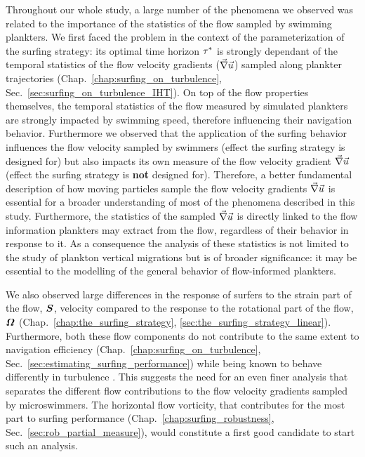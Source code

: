 Throughout our whole study, a large number of the phenomena we observed was related to the importance of the statistics of the flow sampled by swimming plankters.
We first faced the problem in the context of the parameterization of the surfing strategy: its optimal time horizon $\tau^*$ is strongly dependant of the temporal statistics of the flow velocity gradients ($\vec{\nabla} \vec{u}$) sampled along plankter trajectories (Chap.~\ref{chap:surfing_on_turbulence}, Sec.~\ref{sec:surfing_on_turbulence_IHT}).
On top of the flow properties themselves, the temporal statistics of the flow measured by simulated plankters are strongly impacted by swimming speed, therefore influencing their navigation behavior.
Furthermore we observed that the application of the surfing behavior influences the flow velocity sampled by swimmers (effect the surfing strategy is designed for) but also impacts its own measure of the flow velocity gradient $\vec{\nabla} \vec{u}$ (effect the surfing strategy is \textbf{not} designed for).
Therefore, a better fundamental description of how moving particles sample the flow velocity gradients $\vec{\nabla} \vec{u}$ is essential for a broader understanding of most of the phenomena described in this study.
Furthermore, the statistics of the sampled $\vec{\nabla} \vec{u}$ is directly linked to the flow information plankters may extract from the flow, regardless of their behavior in response to it.
As a consequence the analysis of these statistics is not limited to the study of plankton vertical migrations but is of broader significance: it may be essential to the modelling of the general behavior of flow-informed plankters.

We also observed large differences in the response of surfers to the strain part of the flow, $\boldsymbol{S}$, velocity compared to the response to the rotational part of the flow, $\boldsymbol{\varOmega}$ (Chap.~\ref{chap:the_surfing_strategy}, \ref{sec:the_surfing_strategy_linear}).
Furthermore, both these flow components do not contribute to the same extent to navigation efficiency (Chap.~\ref{chap:surfing_on_turbulence}, Sec.~\ref{sec:estimating_surfing_performance}) while being known to behave differently in turbulence \citep{buaria2022vorticity}.
This suggests the need for an even finer analysis that separates the different flow contributions to the flow velocity gradients sampled by microswimmers.
The horizontal flow vorticity, that contributes for the most part to surfing performance (Chap.~\ref{chap:surfing_robustness}, Sec.~\ref{sec:rob_partial_measure}), would constitute a first good candidate to start such an analysis.

